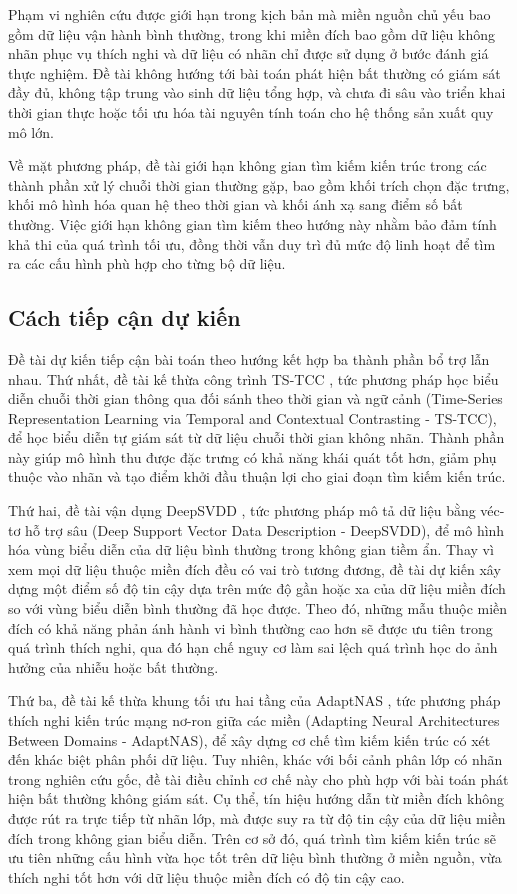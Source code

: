 \documentclass[a4paper]{article}
\begin{document}
Phạm vi nghiên cứu được giới hạn trong kịch bản mà miền nguồn chủ yếu bao gồm dữ liệu vận hành bình thường, trong khi miền đích bao gồm dữ liệu không nhãn phục vụ thích nghi và dữ liệu có nhãn chỉ được sử dụng ở bước đánh giá thực nghiệm. Đề tài không hướng tới bài toán phát hiện bất thường có giám sát đầy đủ, không tập trung vào sinh dữ liệu tổng hợp, và chưa đi sâu vào triển khai thời gian thực hoặc tối ưu hóa tài nguyên tính toán cho hệ thống sản xuất quy mô lớn.

Về mặt phương pháp, đề tài giới hạn không gian tìm kiếm kiến trúc trong các thành phần xử lý chuỗi thời gian thường gặp, bao gồm khối trích chọn đặc trưng, khối mô hình hóa quan hệ theo thời gian và khối ánh xạ sang điểm số bất thường. Việc giới hạn không gian tìm kiếm theo hướng này nhằm bảo đảm tính khả thi của quá trình tối ưu, đồng thời vẫn duy trì đủ mức độ linh hoạt để tìm ra các cấu hình phù hợp cho từng bộ dữ liệu.

\subsection{Cách tiếp cận dự kiến}

Đề tài dự kiến tiếp cận bài toán theo hướng kết hợp ba thành phần bổ trợ lẫn nhau. Thứ nhất, đề tài kế thừa công trình TS-TCC \cite{tstcc}, tức phương pháp học biểu diễn chuỗi thời gian thông qua đối sánh theo thời gian và ngữ cảnh (Time-Series Representation Learning via Temporal and Contextual Contrasting - TS-TCC), để học biểu diễn tự giám sát từ dữ liệu chuỗi thời gian không nhãn. Thành phần này giúp mô hình thu được đặc trưng có khả năng khái quát tốt hơn, giảm phụ thuộc vào nhãn và tạo điểm khởi đầu thuận lợi cho giai đoạn tìm kiếm kiến trúc.

Thứ hai, đề tài vận dụng DeepSVDD \cite{deepsvdd}, tức phương pháp mô tả dữ liệu bằng véc-tơ hỗ trợ sâu (Deep Support Vector Data Description - DeepSVDD), để mô hình hóa vùng biểu diễn của dữ liệu bình thường trong không gian tiềm ẩn. Thay vì xem mọi dữ liệu thuộc miền đích đều có vai trò tương đương, đề tài dự kiến xây dựng một điểm số độ tin cậy dựa trên mức độ gần hoặc xa của dữ liệu miền đích so với vùng biểu diễn bình thường đã học được. Theo đó, những mẫu thuộc miền đích có khả năng phản ánh hành vi bình thường cao hơn sẽ được ưu tiên trong quá trình thích nghi, qua đó hạn chế nguy cơ làm sai lệch quá trình học do ảnh hưởng của nhiễu hoặc bất thường.

Thứ ba, đề tài kế thừa khung tối ưu hai tầng của AdaptNAS \cite{adaptnas}, tức phương pháp thích nghi kiến trúc mạng nơ-ron giữa các miền (Adapting Neural Architectures Between Domains - AdaptNAS), để xây dựng cơ chế tìm kiếm kiến trúc có xét đến khác biệt phân phối dữ liệu. Tuy nhiên, khác với bối cảnh phân lớp có nhãn trong nghiên cứu gốc, đề tài điều chỉnh cơ chế này cho phù hợp với bài toán phát hiện bất thường không giám sát. Cụ thể, tín hiệu hướng dẫn từ miền đích không được rút ra trực tiếp từ nhãn lớp, mà được suy ra từ độ tin cậy của dữ liệu miền đích trong không gian biểu diễn. Trên cơ sở đó, quá trình tìm kiếm kiến trúc sẽ ưu tiên những cấu hình vừa học tốt trên dữ liệu bình thường ở miền nguồn, vừa thích nghi tốt hơn với dữ liệu thuộc miền đích có độ tin cậy cao.
\end{document}
